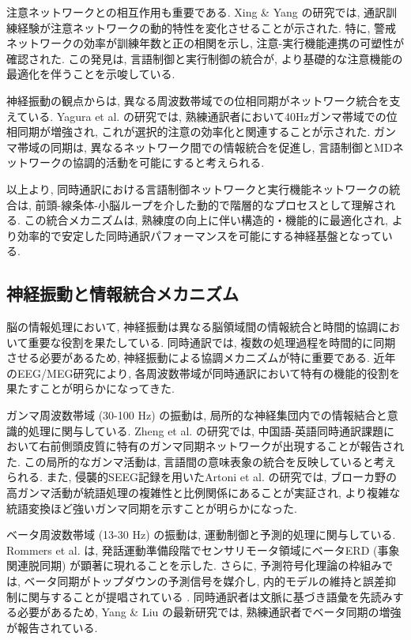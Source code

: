 注意ネットワークとの相互作用も重要である.
Xing \& Yang \cite{Xing2023} の研究では, 通訳訓練経験が注意ネットワークの動的特性を変化させることが示された.
特に, 警戒ネットワークの効率が訓練年数と正の相関を示し, 注意-実行機能連携の可塑性が確認された.
この発見は, 言語制御と実行制御の統合が, より基礎的な注意機能の最適化を伴うことを示唆している.

神経振動の観点からは, 異なる周波数帯域での位相同期がネットワーク統合を支えている.
Yagura et al. \cite{yagura2021selective} の研究では, 熟練通訳者において40Hzガンマ帯域での位相同期が増強され, これが選択的注意の効率化と関連することが示された.
ガンマ帯域の同期は, 異なるネットワーク間での情報統合を促進し, 言語制御とMDネットワークの協調的活動を可能にすると考えられる.

以上より, 同時通訳における言語制御ネットワークと実行機能ネットワークの統合は, 前頭-線条体-小脳ループを介した動的で階層的なプロセスとして理解される.
この統合メカニズムは, 熟練度の向上に伴い構造的・機能的に最適化され, より効率的で安定した同時通訳パフォーマンスを可能にする神経基盤となっている.

\subsection{神経振動と情報統合メカニズム}

脳の情報処理において, 神経振動は異なる脳領域間の情報統合と時間的協調において重要な役割を果たしている.
同時通訳では, 複数の処理過程を時間的に同期させる必要があるため, 神経振動による協調メカニズムが特に重要である.
近年のEEG/MEG研究により, 各周波数帯域が同時通訳において特有の機能的役割を果たすことが明らかになってきた.

ガンマ周波数帯域 (30-100 Hz) の振動は, 局所的な神経集団内での情報結合と意識的処理に関与している.
Zheng et al. \cite{zheng2022} の研究では, 中国語-英語同時通訳課題において右前側頭皮質に特有のガンマ同期ネットワークが出現することが報告された.
この局所的なガンマ活動は, 言語間の意味表象の統合を反映していると考えられる.
また, 侵襲的SEEG記録を用いたArtoni et al. \cite{artoni2020} の研究では, ブローカ野の高ガンマ活動が統語処理の複雑性と比例関係にあることが実証され, より複雑な統語変換ほど強いガンマ同期を示すことが明らかになった.

ベータ周波数帯域 (13-30 Hz) の振動は, 運動制御と予測的処理に関与している.
Rommers et al. \cite{rommers2019} は, 発話運動準備段階でセンサリモータ領域にベータERD (事象関連脱同期) が顕著に現れることを示した.
さらに, 予測符号化理論の枠組みでは, ベータ同期がトップダウンの予測信号を媒介し, 内的モデルの維持と誤差抑制に関与することが提唱されている \cite{arnal2012,lewis2016}.
同時通訳者は文脈に基づき語彙を先読みする必要があるため, Yang \& Liu \cite{load2024} の最新研究では, 熟練通訳者でベータ同期の増強が報告されている.

